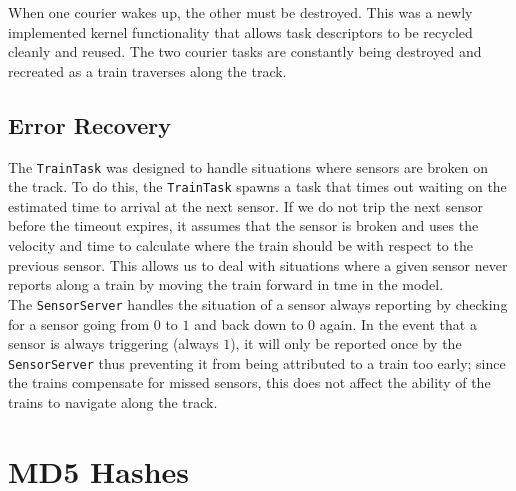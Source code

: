 \documentclass[12pt]{article}
\begin{document}
When one courier wakes up, the other must be destroyed. This was a newly implemented kernel functionality that allows
task descriptors to be recycled cleanly and reused. The two courier tasks are constantly being destroyed and recreated
as a train traverses along the track.
\\[1\baselineskip]
\subsection{Error Recovery}
The {\tt TrainTask} was designed to handle situations where sensors are broken on the track.  To do this, the {\tt TrainTask} spawns a task that times out waiting on the estimated time to arrival at the next sensor.  If we do not trip the next sensor before the timeout expires, it assumes that the sensor is broken and uses the velocity and time to calculate where the train should be with respect to the previous sensor.  This allows us to deal with situations where a given sensor never reports along a train by moving the train forward in tme in the model.
\\
The {\tt SensorServer} handles the situation of a sensor always reporting by checking for a sensor going from $0$ to $1$ and back down to $0$ again.  In the event that a sensor is always triggering (always $1$), it will only be reported once by the {\tt SensorServer} thus preventing it from being attributed to a train too early; since the trains compensate for missed sensors, this does not affect the ability of the trains to navigate along the track.
\\[2\baselineskip]
\section{MD5 Hashes}

\end{document}
